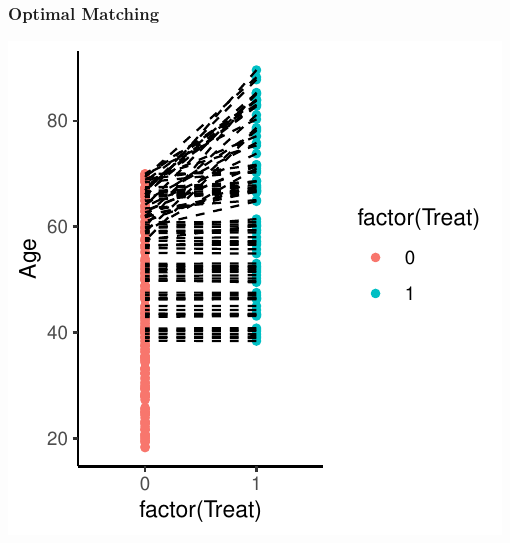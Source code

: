 \documentclass[xcolor=x11names,compress]{beamer}\usepackage[]{graphicx}\usepackage[]{color}
\makeatletter
\def\maxwidth{ %
  \ifdim\Gin@nat@width>\linewidth
    \linewidth
  \else
    \Gin@nat@width
  \fi
}
\newenvironment{knitrout}{}{} %
\renewcommand{\(}{\begin{columns}}
\renewcommand{\)}{\end{columns}}
\newcommand{\<}[1]{\begin{column}{#1}}
\renewcommand{\>}{\end{column}}
\makeatother
\begin{document}
\begin{frame}
\frametitle{Optimal Matching}
\begin{center}
\begin{knitrout}
\color{fgcolor}
\includegraphics[width=\maxwidth]{figure/optimal_matching_2-1} 

\end{knitrout}
\end{center}
\end{frame}
\end{document}
